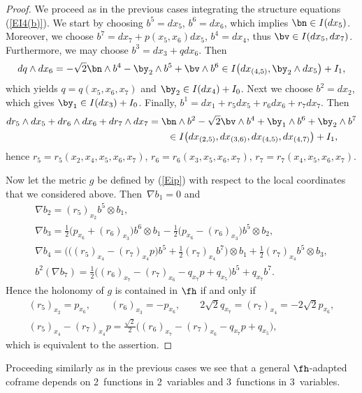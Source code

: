 \begin{proof} We proceed as in the previous cases integrating the structure equations (\ref{EI4(b)}). We start by choosing $b^5=dx_5$, $b^6=dx_6$, which implies $\bn\in I(dx_5)$. Moreover, we choose $b^7= dx_7 +p(x_5,x_6)dx_5$, $b^4=dx_4$, thus $\bv\in I(dx_5,dx_7)$. Furthermore, we may choose $b^3= dx_3+qdx_6$. Then
\begin{gather*}dq\wedge dx_6=-\sqrt 2 \bn\wedge b^4 -\by_2\wedge b^5+\bv\wedge b^6 \in I\big(dx_{(4,5)},\by_2\wedge dx_5\big)+I_1, \end{gather*}
which yields $q=q(x_5,x_6,x_7)$ and $\by_2\in I(dx_4)+I_0$. Next we choose $b^2=dx_2$, which gives $\by_1\in I(dx_3)+I_0$. Finally, $b^1= dx_1 + r_5dx_5+r_6dx_6+r_7dx_7$. Then
\begin{gather*}
dr_5\wedge dx_5+dr_6\wedge dx_6+dr_7\wedge dx_7 = \bn\wedge b^2 -\sqrt 2 \bv\wedge b^4+\by_1\wedge b^6+\by_2\wedge b^7\\
\hphantom{dr_5\wedge dx_5+dr_6\wedge dx_6+dr_7\wedge dx_7}{} \in I\big(dx_{(2,5)}, dx_{(3,6)}, dx_{(4,5)}, dx_{(4,7)}\big) +I_1,
\end{gather*}
hence $r_5=r_5(x_2,x_4,x_5,x_6, x_7)$, $r_6=r_6(x_3,x_5,x_6,x_7)$, $r_7=r_7(x_4,x_5,x_6,x_7)$.

Now let the metric $g$ be defined by (\ref{Eip}) with respect to the local coordinates that we considered above. Then~$\nabla b_1=0$ and
\begin{gather*}
\nabla b_2= (r_5)_{x_2} b^5\otimes b_1,\\
\nabla b_3= \tfrac12 \big(p_{x_6}+(r_6)_{x_3}\big)b^6\otimes b_1 - \tfrac12 \big(p_{x_6}-(r_6)_{x_3}\big)b^5\otimes b_2,\\
\nabla b_4= \big( \big((r_5)_{x_4}-(r_7)_{x_4}p\big)b^5+ \tfrac12 (r_7)_{x_4}b^7\big)\otimes b_1 + \tfrac12 (r_7)_{x_4}b^5\otimes b_3,\\
b^2(\nabla b_7)= \tfrac12 \big( (r_6)_{x_7}-(r_7)_{x_6}-q_{x_7}p+q_{x_5}\big)b^5+q_{x_7}b^7.
\end{gather*}
Hence the holonomy of $g$ is contained in $\fh$ if and only if
\begin{gather*}
(r_5)_{x_2}=p_{x_6},\qquad (r_6)_{x_3}=-p_{x_6},\qquad 2\sqrt2 q_{x_7}=(r_7)_{x_4}=-2\sqrt2 p_{x_6},\\
(r_5)_{x_4}-(r_7)_{x_4}p= \tfrac{\sqrt2}2 \big((r_6)_{x_7}-(r_7)_{x_6}-q_{x_7}p+q_{x_5}\big),
\end{gather*}
which is equivalent to the assertion.
\end{proof}
\begin{Remark} Proceeding similarly as in the previous cases we see that a general $\fh$-adapted coframe depends on 2~functions in 2~variables and 3~functions in 3~variables.
\end{Remark}
